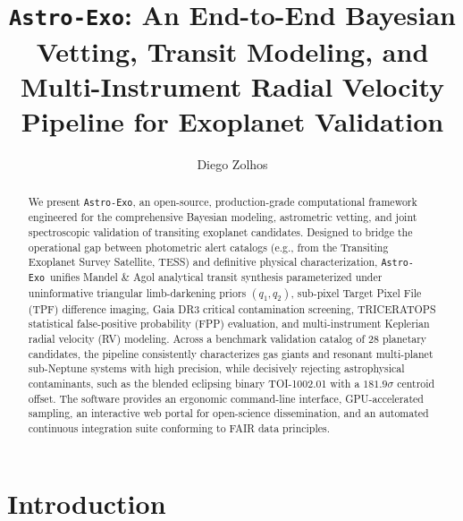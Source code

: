 \documentclass[twocolumn,trackchanges]{aastex631}
\newcommand{\astroexo}{\texttt{Astro-Exo}}
\begin{document}
\title{\astroexo: An End-to-End Bayesian Vetting, Transit Modeling, and Multi-Instrument Radial Velocity Pipeline for Exoplanet Validation}


\author[0009-0000-0000-0000]{Diego Zolhos}

\begin{abstract}
We present \astroexo, an open-source, production-grade computational framework engineered for the comprehensive Bayesian modeling, astrometric vetting, and joint spectroscopic validation of transiting exoplanet candidates. Designed to bridge the operational gap between photometric alert catalogs (e.g., from the Transiting Exoplanet Survey Satellite, TESS) and definitive physical characterization, \astroexo\ unifies Mandel \& Agol analytical transit synthesis parameterized under uninformative triangular limb-darkening priors $(q_1, q_2)$, sub-pixel Target Pixel File (TPF) difference imaging, Gaia DR3 critical contamination screening, TRICERATOPS statistical false-positive probability (FPP) evaluation, and multi-instrument Keplerian radial velocity (RV) modeling. Across a benchmark validation catalog of 28 planetary candidates, the pipeline consistently characterizes gas giants and resonant multi-planet sub-Neptune systems with high precision, while decisively rejecting astrophysical contaminants, such as the blended eclipsing binary TOI-1002.01 with a $181.9\sigma$ centroid offset. The software provides an ergonomic command-line interface, GPU-accelerated sampling, an interactive web portal for open-science dissemination, and an automated continuous integration suite conforming to FAIR data principles.
\end{abstract}


\section{Introduction}
\label{sec:intro}
\end{document}
